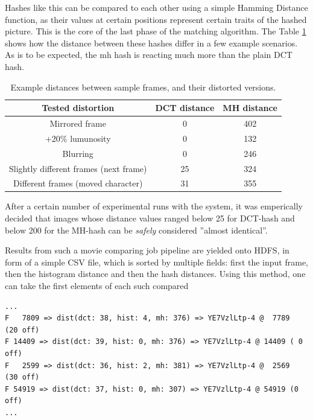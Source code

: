 Hashes like this can be compared to each other using a simple Hamming Distance \cite{hamming-distance} function, as their values at certain positions represent certain traits of the hashed picture. This is the core of the last phase of the matching algorithm. The Table \ref{tab:hash-distances} shows how the distance between these hashes differ in a few example scenarios. As is to be expected, the mh hash is reacting much more than the plain DCT hash. 

\begin{table}[ch!]
  \centering
  \begin{tabular}{|c|c|c|}
    \hline 
    \textbf{Tested distortion}             & \textbf{DCT distance} & \textbf{MH distance} \\ \hline
    Mirrored frame                         & 0                     &  402 \\ \hline
    +20\% lumunosity                       & 0                     &  132 \\ \hline
    Blurring                               & 0                     &  246 \\ \hline
    Slightly different frames (next frame) & 25                    &  324 \\ \hline
    Different frames (moved character)     & 31                    &  355 \\ \hline
    
  \end{tabular}
  \caption{Example distances between sample frames, and their distorted versions.}
  \label{tab:hash-distances}
\end{table}

After a certain number of experimental runs with the system, it was emperically decided that images whose distance values ranged below 25 for DCT-hash and below 200 for the MH-hash can be \textit{safely} considered ''almost identical''.

Results from such a movie comparing job pipeline are yielded onto HDFS, in form of a simple CSV file, which is sorted by multiple fields: first the input frame, then the histogram distance and then the hash distances. Using this method, one can take the first elements of each such compared

\begin{lstlisting}[caption={Examples of ''best'' matches for a few sample frames (mirrored movie). Sampling rate during image extraction was set to 10, which is why all near-matches are reported in multiples of 10 frames}, label={lst:mirrored-results}]
...
F   7809 => dist(dct: 38, hist: 4, mh: 376) => YE7VzlLtp-4 @  7789   (20 off)
F 14409 => dist(dct: 39, hist: 0, mh: 376) => YE7VzlLtp-4 @ 14409 ( 0 off)
F   2599 => dist(dct: 36, hist: 2, mh: 381) => YE7VzlLtp-4 @  2569   (30 off)
F 54919 => dist(dct: 37, hist: 0, mh: 307) => YE7VzlLtp-4 @ 54919 (0 off)
...
\end{lstlisting}


